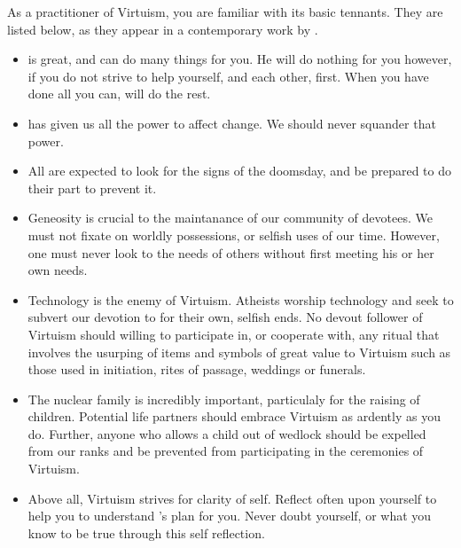 \documentclass[blue]{guildcamp1}
\begin{document}
\name{\bVirtuism{}}

As a practitioner of Virtuism, you are familiar with its basic tennants. They are listed below, as they appear in a contemporary work by \cPastor{\MYname{}}.

\begin{itemize}
  \item \cGod{\MYname{}} is great, and can do many things for you. He will do nothing for you however, if you do not strive to help yourself, and each other, first. When you have done all you can, \cGod{\MYname{}} will do the rest.
  
  \item \cGod{\MYname{}} has given us all the power to affect change. We should never squander that power. 
  
  \item All are expected to look for the signs of the doomsday, and be prepared to do their part to prevent it. 
  
  \item Geneosity is crucial to the maintanance of our community of devotees. We must not fixate on worldly possessions, or selfish uses of our time. However, one must never look to the needs of others without first meeting his or her own needs.
  
  \item Technology is the enemy of Virtuism. Atheists worship technology and seek to subvert our devotion to \cGod{\MYname{}} for their own, selfish ends. No devout follower of Virtuism should willing to participate in, or cooperate with, any ritual that involves the usurping of items and symbols of great value to Virtuism such as those used in initiation, rites of passage, weddings or funerals.
  
  \item The nuclear family is incredibly important, particulaly for the raising of children. Potential life partners should embrace Virtuism as ardently as you do. Further, anyone who allows a child out of wedlock should be expelled from our ranks and be prevented from participating in the ceremonies of Virtuism.
  
  \item Above all, Virtuism strives for clarity of self. Reflect often upon yourself to help you to understand \cGod{\MYname{}}'s plan for you. Never doubt yourself, or what you know to be true through this self reflection.
\end{itemize}
\end{document}
